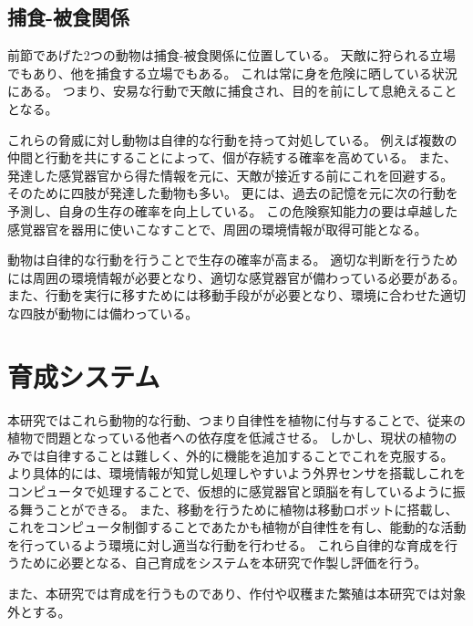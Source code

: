 \subsection{捕食-被食関係}
前節であげた2つの動物は捕食-被食関係に位置している。
天敵に狩られる立場でもあり、他を捕食する立場でもある。
これは常に身を危険に晒している状況にある。
つまり、安易な行動で天敵に捕食され、目的を前にして息絶えることとなる。
\par これらの脅威に対し動物は自律的な行動を持って対処している。
例えば複数の仲間と行動を共にすることによって、個が存続する確率を高めている。
また、発達した感覚器官から得た情報を元に、天敵が接近する前にこれを回避する。
そのために四肢が発達した動物も多い。
更には、過去の記憶を元に次の行動を予測し、自身の生存の確率を向上している。
この危険察知能力の要は卓越した感覚器官を器用に使いこなすことで、周囲の環境情報が取得可能となる。
\par 動物は自律的な行動を行うことで生存の確率が高まる。
適切な判断を行うためには周囲の環境情報が必要となり、適切な感覚器官が備わっている必要がある。
また、行動を実行に移すためには移動手段がが必要となり、環境に合わせた適切な四肢が動物には備わっている。

\section{育成システム}
本研究ではこれら動物的な行動、つまり自律性を植物に付与することで、従来の植物で問題となっている他者への依存度を低減させる。
しかし、現状の植物のみでは自律することは難しく、外的に機能を追加することでこれを克服する。
より具体的には、環境情報が知覚し処理しやすいよう外界センサを搭載しこれをコンピュータで処理することで、仮想的に感覚器官と頭脳を有しているように振る舞うことができる。
また、移動を行うために植物は移動ロボットに搭載し、これをコンピュータ制御することであたかも植物が自律性を有し、能動的な活動を行っているよう環境に対し適当な行動を行わせる。
これら自律的な育成を行うために必要となる、自己育成をシステムを本研究で作製し評価を行う。
\par また、本研究では育成を行うものであり、作付や収穫また繁殖は本研究では対象外とする。

